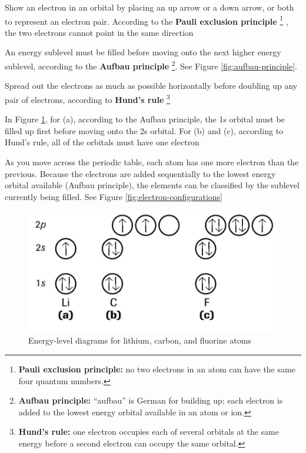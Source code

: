 \begin{bulleted-list}
    \item Show an electron in an orbital by placing an up arrow or a down arrow, or both to represent
        an electron pair. According to the \textbf{Pauli exclusion principle}
        \footnote{
            \textbf{Pauli exclusion principle:} no two electrons in an atom can have the same
            four quantum numbers.
        }
        , the two electrons cannot point in the same direction
    \item An energy sublevel must be filled before moving onto the next higher energy sublevel,
        according to the \textbf{Aufbau principle}
        \footnote{
            \textbf{Aufbau principle:} ``aufbau'' is German for building up; each electron is
            added to the lowest energy orbital available in an atom or ion.
        }.
        See Figure \ref{fig:aufbau-principle}.
    \item Spread out the electrons as much as possible horizontally before doubling up any
        pair of electrons, according to \textbf{Hund's rule}
        \footnote{
            \textbf{Hund's rule:} one electron occupies each of several orbitals at the same
            energy before a second electron can occupy the same orbital.
        }
    \item In Figure \ref{fig:energy-level-diagrams-lithium-carbon-fluorine}, for (a), according
        to the Aufbau principle, the 1s orbital must be filled up first before moving onto the
        2s orbital. For (b) and (c), according to Hund's rule, all of the orbitals must have one electron
    \item As you move across the periodic table, each atom has one more electron than the previous.
        Because the electrons are added sequentially to the lowest energy orbital available
        (Aufbau principle), the elements can be classified by the sublevel currently being filled.
        See Figure \ref{fig:electron-configurations}
\end{bulleted-list}

\begin{figure}[ht!]
    \centering
    \includegraphics[width=0.4 \textwidth]{../figures/energy-level-diagrams-lithium-carbon-fluorine.png}
    \caption{Energy-level diagrams for lithium, carbon, and fluorine atoms}
    \label{fig:energy-level-diagrams-lithium-carbon-fluorine}
\end{figure}

